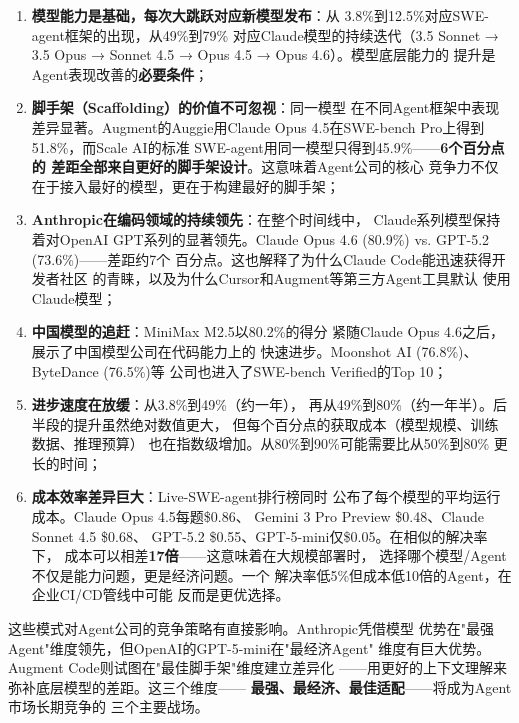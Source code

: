 \begin{enumerate}
  \item \textbf{模型能力是基础，每次大跳跃对应新模型发布}：从
    3.8\%到12.5\%对应SWE-agent框架的出现，从49\%到79\%
    对应Claude模型的持续迭代（3.5 Sonnet → 3.5 Opus →
    Sonnet 4.5 → Opus 4.5 → Opus 4.6）。模型底层能力的
    提升是Agent表现改善的\textbf{必要条件}；

  \item \textbf{脚手架（Scaffolding）的价值不可忽视}：同一模型
    在不同Agent框架中表现差异显著。Augment的Auggie用Claude
    Opus 4.5在SWE-bench Pro上得到51.8\%，而Scale AI的标准
    SWE-agent用同一模型只得到45.9\%——\textbf{6个百分点的
    差距全部来自更好的脚手架设计}。这意味着Agent公司的核心
    竞争力不仅在于接入最好的模型，更在于构建最好的脚手架；

  \item \textbf{Anthropic在编码领域的持续领先}：在整个时间线中，
    Claude系列模型保持着对OpenAI GPT系列的显著领先。Claude
    Opus 4.6 (80.9\%) vs. GPT-5.2 (73.6\%)——差距约7个
    百分点。这也解释了为什么Claude Code能迅速获得开发者社区
    的青睐，以及为什么Cursor和Augment等第三方Agent工具默认
    使用Claude模型；

  \item \textbf{中国模型的追赶}：MiniMax M2.5以80.2\%的得分
    紧随Claude Opus 4.6之后，展示了中国模型公司在代码能力上的
    快速进步。Moonshot AI (76.8\%)、ByteDance (76.5\%)等
    公司也进入了SWE-bench Verified的Top 10；

  \item \textbf{进步速度在放缓}：从3.8\%到49\%（约一年），
    再从49\%到80\%（约一年半）。后半段的提升虽然绝对数值更大，
    但每个百分点的获取成本（模型规模、训练数据、推理预算）
    也在指数级增加。从80\%到90\%可能需要比从50\%到80\%
    更长的时间；

  \item \textbf{成本效率差异巨大}：Live-SWE-agent排行榜同时
    公布了每个模型的平均运行成本。Claude Opus 4.5每题\$0.86、
    Gemini 3 Pro Preview \$0.48、Claude Sonnet 4.5 \$0.68、
    GPT-5.2 \$0.55、GPT-5-mini仅\$0.05。在相似的解决率下，
    成本可以相差\textbf{17倍}——这意味着在大规模部署时，
    选择哪个模型/Agent不仅是能力问题，更是经济问题。一个
    解决率低5\%但成本低10倍的Agent，在企业CI/CD管线中可能
    反而是更优选择。
\end{enumerate}

这些模式对Agent公司的竞争策略有直接影响。Anthropic凭借模型
优势在"最强Agent"维度领先，但OpenAI的GPT-5-mini在"最经济Agent"
维度有巨大优势。Augment Code则试图在"最佳脚手架"维度建立差异化
——用更好的上下文理解来弥补底层模型的差距。这三个维度——
\textbf{最强、最经济、最佳适配}——将成为Agent市场长期竞争的
三个主要战场。


